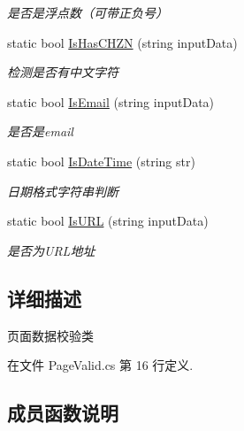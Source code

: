 \begin{DoxyCompactItemize}
\begin{DoxyCompactList}\small\item\em 是否是浮点数（可带正负号） \end{DoxyCompactList}\item 
static bool \hyperlink{class_x_c_l_net_tools_1_1_string_hander_1_1_page_valid_a13211b08f74ed73f0ea6483eb065aeb3}{Is\+Has\+C\+H\+ZN} (string input\+Data)
\begin{DoxyCompactList}\small\item\em 检测是否有中文字符 \end{DoxyCompactList}\item 
static bool \hyperlink{class_x_c_l_net_tools_1_1_string_hander_1_1_page_valid_a937e79914e914c2c820f5c9af0273c6e}{Is\+Email} (string input\+Data)
\begin{DoxyCompactList}\small\item\em 是否是email \end{DoxyCompactList}\item 
static bool \hyperlink{class_x_c_l_net_tools_1_1_string_hander_1_1_page_valid_ad5e0e978f61e949d4d6548fc3509cdea}{Is\+Date\+Time} (string str)
\begin{DoxyCompactList}\small\item\em 日期格式字符串判断 \end{DoxyCompactList}\item 
static bool \hyperlink{class_x_c_l_net_tools_1_1_string_hander_1_1_page_valid_a1b7a8a961ee9d599e74d29301475d69e}{Is\+U\+RL} (string input\+Data)
\begin{DoxyCompactList}\small\item\em 是否为\+U\+R\+L地址 \end{DoxyCompactList}\end{DoxyCompactItemize}


\subsection{详细描述}
页面数据校验类 



在文件 Page\+Valid.\+cs 第 16 行定义.



\subsection{成员函数说明}
\mbox{\label{class_x_c_l_net_tools_1_1_string_hander_1_1_page_valid_ad5e0e978f61e949d4d6548fc3509cdea}} 

